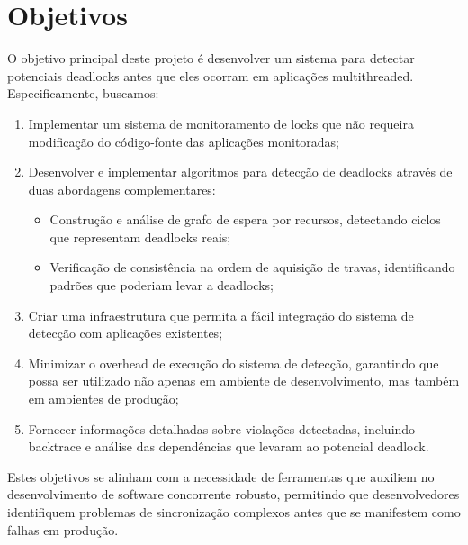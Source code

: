 \section{Objetivos}\label{sec:objetivos}

O objetivo principal deste projeto é desenvolver um sistema para detectar potenciais deadlocks antes que eles ocorram em aplicações multithreaded. Especificamente, buscamos:

\begin{enumerate}
    \item Implementar um sistema de monitoramento de locks que não requeira modificação do código-fonte das aplicações monitoradas;

    \item Desenvolver e implementar algoritmos para detecção de deadlocks através de duas abordagens complementares:
    \begin{itemize}
        \item Construção e análise de grafo de espera por recursos, detectando ciclos que representam deadlocks reais;
        \item Verificação de consistência na ordem de aquisição de travas, identificando padrões que poderiam levar a deadlocks;
    \end{itemize}

    \item Criar uma infraestrutura que permita a fácil integração do sistema de detecção com aplicações existentes;

    \item Minimizar o overhead de execução do sistema de detecção, garantindo que possa ser utilizado não apenas em ambiente de desenvolvimento, mas também em ambientes de produção;

    \item Fornecer informações detalhadas sobre violações detectadas, incluindo backtrace e análise das dependências que levaram ao potencial deadlock.
\end{enumerate}

Estes objetivos se alinham com a necessidade de ferramentas que auxiliem no desenvolvimento de software concorrente robusto, permitindo que desenvolvedores identifiquem problemas de sincronização complexos antes que se manifestem como falhas em produção.
